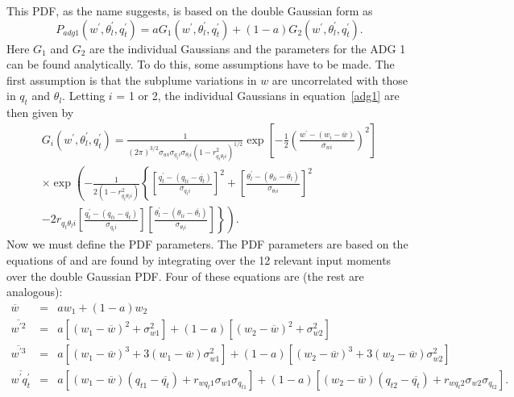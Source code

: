 This PDF, as the name suggests, is based on the double Gaussian form as
%
\begin{equation}
  P_{adg1}(w^{'},\theta_{l}^{'},q_{t}^{'})=aG_{1}(w^{'},\theta_{l}^{'},q_{t}^{'})+(1-a)G_{2}(w^{'},\theta_{l}^{'},q_{t}^{'}).
  \label{adg1}
\end{equation}
%
Here $G_{1}$ and $G_{2}$ are the individual Gaussians and the parameters for the ADG 1 can be found analytically.  To do this, some assumptions have to be made.  The first assumption is that the subplume variations in $w$ are uncorrelated with those in $q_{t}$ and $\theta_{l}$.  Letting $i$ = 1 or 2, the individual Gaussians in equation~\ref{adg1} are then given by
%
\begin{equation}
  \label{ind_gaus}
  \begin{split}
    G_{i}(w^{'},\theta_{l}^{'},q_{t}^{'})=\frac{1}{(2\pi)^{3/2}\sigma_{wi}\sigma_{q_{t}i}\sigma_{\theta_{l}i}(1-r_{q_{t}\theta_{l}i}^{2})^{1/2}}\exp\left[-\frac{1}{2}\left(\frac{w^{'}-(w_{i}-\overline{w})}{\sigma_{wi}}\right)^{2}\right] \\
    \times \exp\left(-\frac{1}{2(1-r_{q_{t}\theta_{l}i}^{2})}\left\{\left[\frac{q_{t}^{'}-(q_{ti}-\overline{q_{t}})}{\sigma_{q_{t}i}}\right]^{2}+\left[\frac{\theta_{l}^{'}-(\theta_{li}-\overline{\theta_{l}})}{\sigma_{\theta_{l}i}}\right]^{2} \right. \right. \\
    -\left.\left.2r_{q_{t}\theta_{l}i}\left[\frac{q_{t}^{'}-(q_{ti}-\overline{q_{t}})}{\sigma_{q_{t}i}}\right]\left[\frac{\theta_{l}^{'}-(\theta_{li}-\overline{\theta_{l}})}{\sigma_{\theta_{l}i}}\right]\right\}\right).
  \end{split}
\end{equation}
%
Now we must define the PDF parameters.  The PDF parameters are based on the equations of \cite{Lewellen_Yoh93} and are found by integrating over the 12 relevant input moments over the double Gaussian PDF.  Four of these equations are (the rest are analogous):
%
\begin{eqnarray}
    \overline{w} &=& aw_{1}+(1-a)w_{2}  \label{mom_equations} \\
    \overline{w^{'2}} &=& a[(w_{1}-\overline{w})^{2}+\sigma_{w1}^{2}]+(1-a)[(w_{2}-\overline{w})^{2}+\sigma_{w2}^{2}] \nonumber \\
    \overline{w^{'3}} &=& a[(w_{1}-\overline{w})^{3}+3(w_{1}-\overline{w})\sigma_{w1}^{2}]+(1-a)[(w_{2}-\overline{w})^{3}+3(w_{2}-\overline{w})\sigma_{w2}^{2}] \nonumber \\
    \overline{w^{'}q_{t}^{'}} &=& a[(w_{1}-\overline{w})(q_{t1}-\overline{q_{t}})+r_{wq_{t}1}\sigma_{w1}\sigma_{q_{t1}}]+(1-a)[(w_{2}-\overline{w})(q_{t2}-\overline{q_{t}})+r_{wq_{t}2}\sigma_{w2}\sigma_{q_{t2}}]. \nonumber
\end{eqnarray}
